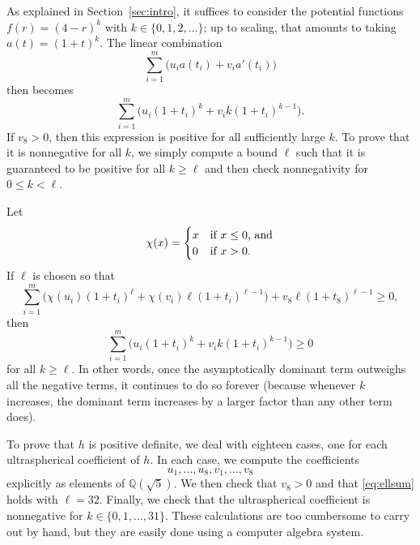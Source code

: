 \documentclass{jams-l}
\theoremstyle{plain}
\numberwithin{theorem}{section}
\theoremstyle{definition}
\numberwithin{equation}{section}
\newcommand{\Q}{{\mathbb Q}}
\begin{document}
As explained in Section~\ref{sec:intro}, it suffices to consider
the potential functions $f(r) = (4-r)^k$ with $k \in
\{0,1,2,\dots\}$; up to scaling, that amounts to taking $a(t) =
(1+t)^k$.  The linear combination
$$
\sum_{i=1}^m \big(u_i a(t_i) + v_i a'(t_i)\big)
$$
then becomes
$$
\sum_{i=1}^m \big(u_i (1+t_i)^k + v_i k (1+t_i)^{k-1}\big).
$$
If $v_8>0$, then this expression is positive for all sufficiently
large $k$.  To prove that it is nonnegative for all $k$, we simply
compute a bound $\ell$ such that it is guaranteed to be positive
for all $k \ge \ell$ and then check nonnegativity for $0 \le k <
\ell$.

Let
$$
\chi(x) = \begin{cases} x & \textup{if $x\le 0$, and}\\
0 & \textup{if $x>0$.}
\end{cases}
$$
If $\ell$ is chosen so that
\begin{equation}
\label{eq:ellsum} \sum_{i=1}^m \big(\chi(u_i) (1+t_i)^\ell +
\chi(v_i) \ell (1+t_i)^{\ell-1}\big) + v_8 \ell (1+t_8)^{\ell-1}
\ge 0,
\end{equation}
then
$$
\sum_{i=1}^m \big(u_i (1+t_i)^k + v_i k (1+t_i)^{k-1}\big) \ge 0
$$
for all $k \ge \ell$.  In other words, once the asymptotically
dominant term outweighs all the negative terms, it continues to do
so forever (because whenever $k$ increases, the dominant term
increases by a larger factor than any other term does).

To prove that $h$ is positive definite, we deal with eighteen
cases, one for each ultraspherical coefficient of $h$.  In each
case, we compute the coefficients
$$
u_1,\dots,u_8,v_1,\dots,v_8
$$
explicitly as elements of $\Q(\sqrt{5})$.  We then check that
$v_8>0$ and that \eqref{eq:ellsum} holds with $\ell=32$.  Finally,
we check that the ultraspherical coefficient is nonnegative for $k
\in \{0,1,\dots,31\}$.  These calculations are too cumbersome to
carry out by hand, but they are easily done using a computer
algebra system.
\end{document}
